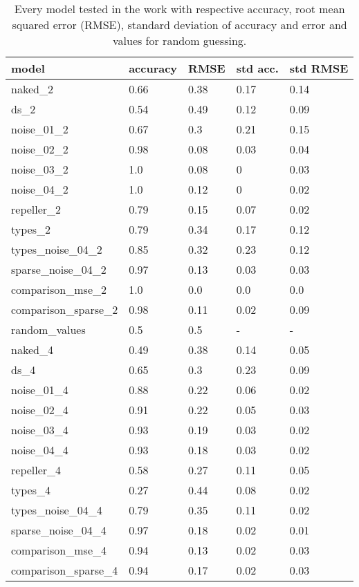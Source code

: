 \begin{table}[!htb]
	\centering
	\caption{Every model tested in the work with respective accuracy, root mean squared error (RMSE), standard deviation of accuracy and error and values for random guessing.}
	\begin{tabularx}{\textwidth}{p{5cm} X X X X}
		\hline
		model & accuracy & RMSE & std acc. & std RMSE\\ 
		\hline
		naked\_2 & 0.66 & 0.38 & 0.17 & 0.14 \\
		ds\_2 & 0.54 & 0.49 & 0.12 & 0.09 \\
		noise\_01\_2 & 0.67 & 0.3 & 0.21 & 0.15 \\
		noise\_02\_2 & 0.98 & 0.08 & 0.03 & 0.04 \\
		noise\_03\_2 & 1.0 & 0.08 & 0 & 0.03 \\
		noise\_04\_2 & 1.0 & 0.12 & 0 & 0.02 \\
		repeller\_2 & 0.79 & 0.15 & 0.07 & 0.02 \\
		types\_2 & 0.79 & 0.34 & 0.17 & 0.12 \\
		types\_noise\_04\_2 & 0.85 & 0.32 & 0.23 & 0.12 \\
		sparse\_noise\_04\_2 & 0.97 & 0.13 & 0.03 & 0.03 \\
		comparison\_mse\_2 & 1.0 &0.0& 0.0& 0.0 \\
		comparison\_sparse\_2 & 0.98 & 0.11 & 0.02 & 0.09 \\
		random\_values & 0.5 & 0.5 & - & - \\
		\hline
		naked\_4 & 0.49 & 0.38 & 0.14 & 0.05 \\
		ds\_4 & 0.65 & 0.3 & 0.23 & 0.09 \\
		noise\_01\_4 & 0.88 & 0.22 & 0.06 & 0.02 \\
		noise\_02\_4 & 0.91 & 0.22 & 0.05 & 0.03 \\
		noise\_03\_4 & 0.93 & 0.19 & 0.03 & 0.02 \\
		noise\_04\_4 & 0.93 & 0.18 & 0.03& 0.02 \\
		repeller\_4 & 0.58 & 0.27 & 0.11 & 0.05 \\
		types\_4 & 0.27 & 0.44 & 0.08 & 0.02 \\
		types\_noise\_04\_4 & 0.79 & 0.35 & 0.11 & 0.02 \\
		sparse\_noise\_04\_4 & 0.97 & 0.18 & 0.02 & 0.01 \\
		comparison\_mse\_4 & 0.94 & 0.13& 0.02& 0.03 \\
		comparison\_sparse\_4 & 0.94& 0.17 & 0.02& 0.03 \\		

\end{tabularx}
\end{table}
